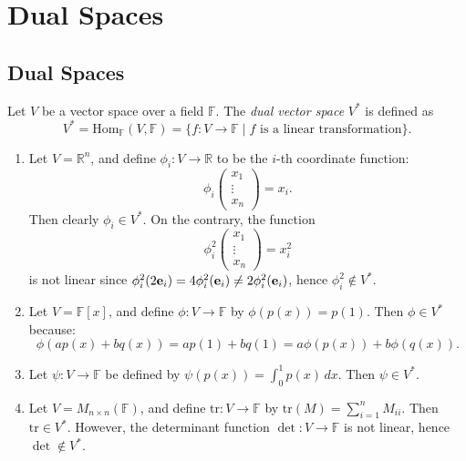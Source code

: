 \chapter{Dual Spaces}
\section{Dual Spaces}
\begin{definition}\label{def:dual-space}
Let $V$ be a vector space over a field $\mathbb{F}$. The \emph{dual vector space} $V^*$ is defined as
\[
V^* = \mathrm{Hom}_{\mathbb{F}}(V, \mathbb{F}) = \{ f : V \to \mathbb{F} \mid f \text{ is a linear transformation} \}.
\]
\end{definition}

\begin{example}
\leavevmode
\begin{enumerate}
  \item Let $V = \mathbb{R}^n$, and define $\phi_i : V \to \mathbb{R}$ to be the $i$-th coordinate function:
  \[
  \phi_i \begin{pmatrix} x_1 \\ \vdots \\ x_n \end{pmatrix} = x_i.
  \]
  Then clearly $\phi_i \in V^*$. On the contrary, the function
  \[
  \phi_i^2 \begin{pmatrix} x_1 \\ \vdots \\ x_n \end{pmatrix} = x_i^2
  \]
  is not linear since $\phi_i^2(2{\bf e}_i) = 4\phi_i^2({\bf e}_i) \neq 2\phi_i^2({\bf e}_i)$, hence $\phi_i^2 \notin V^*$.

  \item Let $V = \mathbb{F}[x]$, and define $\phi : V \to \mathbb{F}$ by $\phi(p(x)) = p(1)$. Then $\phi \in V^*$ because:
  \[
  \phi(ap(x) + bq(x)) = ap(1) + bq(1) = a \phi(p(x)) + b \phi(q(x)).
  \]

  \item Let $\psi : V \to \mathbb{F}$ be defined by $\psi(p(x)) = \int_0^1 p(x)\,dx$. Then $\psi \in V^*$.

  \item Let $V = M_{n \times n}(\mathbb{F})$, and define $\mathrm{tr} : V \to \mathbb{F}$ by $\mathrm{tr}(M) = \sum_{i=1}^n M_{ii}$. Then $\mathrm{tr} \in V^*$. However, the determinant function $\det : V \to \mathbb{F}$ is not linear, hence $\det \notin V^*$.
\end{enumerate}
\end{example}

